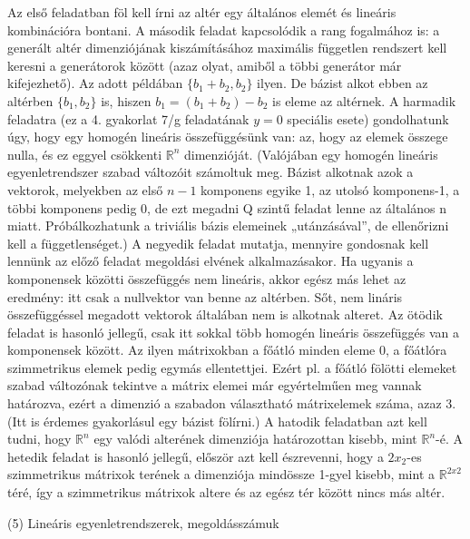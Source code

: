 \begin{frame}
  \begin{tcolorbox}[title={4/7. {\symqueen}}]
Az első feladatban föl kell írni az altér egy általános elemét és lineáris kombinációra bontani. A második feladat kapcsolódik a rang fogalmához is: a generált altér dimenziójának kiszámításához maximális független rendszert kell keresni a generátorok között (azaz olyat, amiből a többi generátor már kifejezhető). Az adott példában $\{b_1 + b_2,b_2\}$ ilyen. De bázist alkot ebben az altérben $\{b_1,b_2\}$ is, hiszen $b_1 = (b_1 + b_2) - b_2$ is eleme az altérnek. A harmadik feladatra (ez a 4. gyakorlat 7/g feladatának $y = 0$ speciális esete) gondolhatunk úgy, hogy egy homogén lineáris összefüggésünk van: az, hogy az elemek összege nulla, és ez eggyel csökkenti $\mathbb{R}^n$ dimenzióját. (Valójában egy homogén lineáris egyenletrendszer szabad változóit számoltuk meg. Bázist alkotnak azok a vektorok, melyekben az első $n-1$ komponens egyike 1, az utolsó komponens-1, a többi komponens pedig 0, de ezt megadni Q szintű feladat lenne az általános n miatt. Próbálkozhatunk a triviális bázis elemeinek „utánzásával”, de ellenőrizni kell a függetlenséget.) A negyedik feladat mutatja, mennyire gondosnak kell lennünk az előző feladat megoldási elvének alkalmazásakor. Ha ugyanis a komponensek közötti összefüggés nem lineáris, akkor egész más lehet az eredmény: itt csak a nullvektor van benne az altérben. Sőt, nem lináris összefüggéssel megadott vektorok általában nem is alkotnak alteret. Az ötödik feladat is hasonló jellegű, csak itt sokkal több homogén lineáris összefüggés van a komponensek között. Az ilyen mátrixokban a főátló minden eleme 0, a főátlóra szimmetrikus elemek pedig egymás ellentettjei. Ezért pl. a főátló fölötti elemeket szabad változónak tekintve a mátrix elemei már egyértelműen meg vannak határozva, ezért a dimenzió a szabadon választható mátrixelemek száma, azaz 3. (Itt is érdemes gyakorlásul egy bázist fölírni.) A hatodik feladatban azt kell tudni, hogy $\mathbb{R}^n$ egy valódi alterének dimenziója határozottan kisebb, mint $\mathbb{R}^n$-é. A hetedik feladat is hasonló jellegű, először azt kell észrevenni, hogy a $2x_2$-es szimmetrikus mátrixok terének a dimenziója mindössze 1-gyel kisebb, mint a $\mathbb{R}^{2 x 2}$ téré, így a szimmetrikus mátrixok altere és az egész tér között nincs más altér.
  \end{tcolorbox}
\end{frame}



\begin{frame}[plain]
\begin{tcolorbox}[center, colback={myyellow}, coltext={black}, colframe={myyellow}]
    {\RHuge  (5) Lineáris egyenletrendszerek, megoldásszámuk}
    \mmedskip
\end{tcolorbox}
\end{frame}

